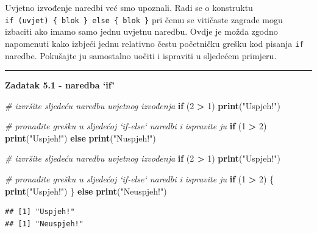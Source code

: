 \documentclass[]{book}
\newenvironment{Shaded}{\begin{snugshade}}{\end{snugshade}}
\newcommand{\KeywordTok}[1]{\textcolor[rgb]{0.13,0.29,0.53}{\textbf{#1}}}
\newcommand{\DecValTok}[1]{\textcolor[rgb]{0.00,0.00,0.81}{#1}}
\newcommand{\StringTok}[1]{\textcolor[rgb]{0.31,0.60,0.02}{#1}}
\newcommand{\CommentTok}[1]{\textcolor[rgb]{0.56,0.35,0.01}{\textit{#1}}}
\newcommand{\ControlFlowTok}[1]{\textcolor[rgb]{0.13,0.29,0.53}{\textbf{#1}}}
\newcommand{\OperatorTok}[1]{\textcolor[rgb]{0.81,0.36,0.00}{\textbf{#1}}}
\newcommand{\NormalTok}[1]{#1}
\theoremstyle{definition}
\theoremstyle{definition}
\theoremstyle{definition}
\theoremstyle{remark}
\begin{document}
Uvjetno izvođenje naredbi već smo upoznali. Radi se o konstruktu
\texttt{if\ (uvjet)\ \{\ blok\ \}\ else\ \{\ blok\ \}} pri čemu se
vitičaste zagrade mogu izbaciti ako imamo samo jednu uvjetnu naredbu.
Ovdje je možda zgodno napomenuti kako izbjeći jednu relativno čestu
početničku grešku kod pisanja \texttt{if} naredbe. Pokušajte ju
samostalno uočiti i ispraviti u sljedećem primjeru.

\begin{center}\rule{0.5\linewidth}{\linethickness}\end{center}

\textbf{Zadatak 5.1 - naredba `if'}

\begin{Shaded}
\begin{Highlighting}[]
\CommentTok{# izvršite sljedeću naredbu uvjetnog izvođenja}
\ControlFlowTok{if}\NormalTok{ (}\DecValTok{2} \OperatorTok{>}\StringTok{ }\DecValTok{1}\NormalTok{) }\KeywordTok{print}\NormalTok{(}\StringTok{"Uspjeh!"}\NormalTok{)}


\CommentTok{# pronađite grešku u sljedećoj `if-else` naredbi i ispravite ju}
\ControlFlowTok{if}\NormalTok{ (}\DecValTok{1} \OperatorTok{>}\StringTok{ }\DecValTok{2}\NormalTok{) }\KeywordTok{print}\NormalTok{(}\StringTok{"Uspjeh!"}\NormalTok{)}
\ControlFlowTok{else} \KeywordTok{print}\NormalTok{(}\StringTok{"Nuspjeh!"}\NormalTok{)}
\end{Highlighting}
\end{Shaded}

\begin{Shaded}
\begin{Highlighting}[]
\CommentTok{# izvršite sljedeću naredbu uvjetnog izvođenja}
\ControlFlowTok{if}\NormalTok{ (}\DecValTok{2} \OperatorTok{>}\StringTok{ }\DecValTok{1}\NormalTok{) }\KeywordTok{print}\NormalTok{(}\StringTok{"Uspjeh!"}\NormalTok{)}


\CommentTok{# pronađite grešku u sljedećoj `if-else` naredbi i ispravite ju}
\ControlFlowTok{if}\NormalTok{ (}\DecValTok{1} \OperatorTok{>}\StringTok{ }\DecValTok{2}\NormalTok{) \{ }\KeywordTok{print}\NormalTok{(}\StringTok{"Uspjeh!"}\NormalTok{) }
\NormalTok{  \} }\ControlFlowTok{else} \KeywordTok{print}\NormalTok{(}\StringTok{"Neuspjeh!"}\NormalTok{)}
\end{Highlighting}
\end{Shaded}

\begin{verbatim}
## [1] "Uspjeh!"
## [1] "Neuspjeh!"
\end{verbatim}
\end{document}

